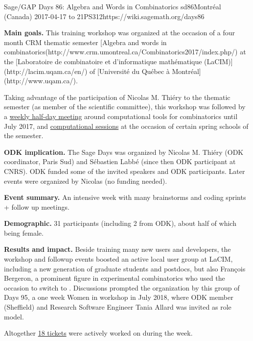 \begin{event}{Sage/GAP Days 86: Algebra and Words in Combinatorics }{sd86}{Montréal (Canada) 2017-04-17 to 21}{PS}{31}{2}{https://wiki.sagemath.org/days86}

  \textbf{Main goals.} This training workshop was organized at the
  occasion of a four month CRM thematic semester
  [Algebra and words in combinatorics(http://www.crm.umontreal.ca/Combinatorics2017/index.php/)
  at the [Laboratoire de combinatoire et d'informatique mathématique (LaCIM)](http://lacim.uqam.ca/en/) of
  [Université du Québec à Montréal](http://www.uqam.ca/).

  Taking advantage of the participation of Nicolas M. Thiéry to the
  thematic semester (as member of the scientific committee), this
  workshop was followed by a
  \href{https://wiki.sagemath.org/Montreal}{weekly half-day meeting}
  around computational tools for combinatorics until July 2017, and
  \href{https://more-sagemath-tutorials.readthedocs.io/en/latest/2017-05-29-CRM/}{computational
    sessions} at the occasion of certain spring schools of the
  semester.

  \textbf{ODK implication.} The Sage Days was organized by Nicolas M.
  Thiéry (ODK coordinator, Paris Sud) and Sébastien Labbé (since then
  ODK participant at CNRS). ODK funded some of the invited speakers
  and ODK participants. Later events were organized by Nicolas (no
  funding needed).

  \textbf{Event summary.} An intensive week with many brainstorms and
  coding sprints + follow up meetings.

  \textbf{Demographic.} 31 participants (including 2 from ODK), about
  half of which being female.

  \textbf{Results and impact.} Beside training many new \Sage users
  and developers, the workshop and followup events boosted an active
  local user group at LaCIM, including a new generation of graduate
  students and postdocs, but also François Bergeron, a prominent
  figure in experimental combinatorics who used the occasion to switch
  to \Sage. Discussions prompted the organization by this group of
  \Sage Days 95, a one week Women in \Sage workshop in July 2018,
  where ODK member (Sheffield) and Research Software Engineer Tania
  Allard was invited as role model.

  Altogether
  \href{https://trac.sagemath.org/query?status=closed&status=needs_info&status=needs_review&status=needs_work&status=new&status=positive_review&keywords=~days86&col=id&col=summary&col=status&col=time&col=changetime&col=author&col=reviewer&order=status}{18
    \Sage tickets} were actively worked on during the week.
\end{event}
